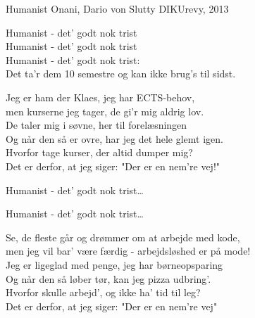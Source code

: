 \begin{song}{Humanist}
  {} %
  {Onani, Dario von Slutty} %
  {} %
  {DIKUrevy, 2013} %
  {\NotCCLIed} %

  \begin{SBChorus}
    Humanist - det' godt nok trist\\
    Humanist - det' godt nok trist\\
    Humanist - det' godt nok trist:\\
    Det ta'r dem 10 semestre og kan ikke brug's til sidst.
  \end{SBChorus}

  \begin{SBVerse}
    Jeg er ham der Klaes, jeg har ECTS-behov,\\
    men kurserne jeg tager, de gi'r mig aldrig lov.\\
    De taler mig i søvne, her til forelæsningen\\
    Og når den så er ovre, har jeg det hele glemt igen.\\
    Hvorfor tage kurser, der altid dumper mig?\\
    Det er derfor, at jeg siger: "Der er en nem're vej!"
  \end{SBVerse}

  \begin{SBChorus}
    Humanist - det' godt nok trist\ldots
  \end{SBChorus}

  \begin{SBChorus}
    Humanist - det' godt nok trist\ldots
  \end{SBChorus}

  \begin{SBVerse}
    Se, de fleste går og drømmer om at arbejde med kode,\\
    men jeg vil bar' være færdig - arbejdsløshed er på mode!\\
    Jeg er ligeglad med penge, jeg har børneopsparing\\
    Og når den så løber tør, kan jeg pizza udbring'.\\
    Hvorfor skulle arbejd', og ikke ha' tid til leg?\\
    Det er derfor, at jeg siger: "Der er en nem're vej"
  \end{SBVerse}


\end{song}
